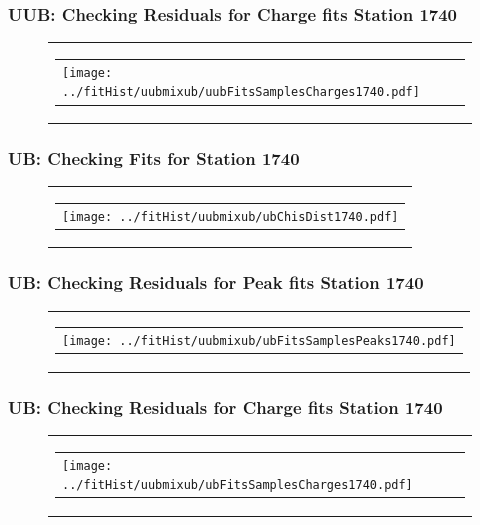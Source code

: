 \documentclass[aspectratio=169]{beamer}
\begin{document}
\begin{frame}
  \frametitle{UUB: Checking Residuals for Charge fits Station 1740}
  \begin{figure}
    \centering
    \begin{tabularx}{\textwidth}{C}
      \begin{tabular}{l}
        \texttt{[image: ../fitHist/uubmixub/uubFitsSamplesCharges1740.pdf]}
      \end{tabular}
    \end{tabularx}
  \end{figure}
\end{frame}


\begin{frame}
  \frametitle{UB: Checking Fits for Station 1740}
  \begin{figure}
    \centering
    \begin{tabularx}{\textwidth}{C}
      \begin{tabular}{l}
        \texttt{[image: ../fitHist/uubmixub/ubChisDist1740.pdf]}
      \end{tabular}
    \end{tabularx}
  \end{figure}
\end{frame}

\begin{frame}
  \frametitle{UB: Checking Residuals for Peak fits Station 1740}
  \begin{figure}
    \centering
    \begin{tabularx}{\textwidth}{C}
      \begin{tabular}{l}
        \texttt{[image: ../fitHist/uubmixub/ubFitsSamplesPeaks1740.pdf]}
      \end{tabular}
    \end{tabularx}
  \end{figure}
\end{frame}

\begin{frame}
  \frametitle{UB: Checking Residuals for Charge fits Station 1740}
  \begin{figure}
    \centering
    \begin{tabularx}{\textwidth}{C}
      \begin{tabular}{l}
        \texttt{[image: ../fitHist/uubmixub/ubFitsSamplesCharges1740.pdf]}
      \end{tabular}
    \end{tabularx}
  \end{figure}
\end{frame}
\end{document}
